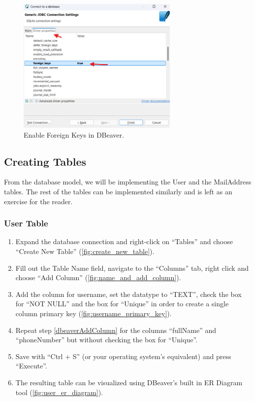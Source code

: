 \documentclass[a4paper,11pt,oneside]{article}
\begin{document}
\begin{sloppypar}
\begin{figure}[!htb]
  \centering
  \includegraphics[width=0.7\textwidth]{dbeaver/create_foreign_keys_enable.png}
  \caption{Enable Foreign Keys in DBeaver.}
  \label{fig:create_foreign_keys_enable}
\end{figure}



\subsection{Creating Tables}
\label{dbeaverCreatingTable}
From the database model, we will be implementing the User and the MailAddress tables. The rest of the tables can be implemented similarly and is left as an exercise for the reader.

\subsubsection{User Table}
\label{dbeaverUserTable}

\begin{enumerate}
  \item \label{dbeaverCreateTable} Expand the database connection and right-click on ``Tables'' and choose ``Create New Table'' (\autoref{fig:create_new_table}).
  \item Fill out the Table Name field, navigate to the ``Columns'' tab, right click and choose ``Add Column'' (\autoref{fig:name_and_add_column}).
  \item \label{dbeaverAddColumn} Add the column for username, set the datatype to ``TEXT'', check the box for ``NOT NULL'' and the box for ``Unique'' in order to create a single column primary key (\autoref{fig:username_primary_key}).
  \item Repeat step \ref{dbeaverAddColumn} for the columns ``fullName'' and ``phoneNumber'' but without checking the box for ``Unique''.
  \item Save with ``Ctrl + S'' (or your operating system's equivalent) and press ``Execute''.
  \item The resulting table can be visualized using DBeaver's built in ER Diagram tool (\autoref{fig:user_er_diagram}). 
\end{enumerate}


\end{sloppypar}
\end{document}
